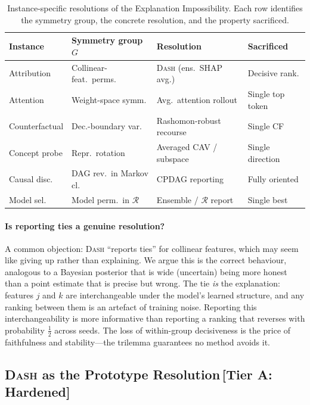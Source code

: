 \documentclass[11pt,a4paper]{article}
\newcommand{\DASH}{\textsc{Dash}}
\begin{document}
\begin{table}[t]
\centering
\caption{Instance-specific resolutions of the Explanation
  Impossibility.  Each row identifies the symmetry group, the concrete
  resolution, and the property sacrificed.}
\label{tab:resolutions}
\small
\setlength{\tabcolsep}{4pt}
\begin{tabular}{@{}llll@{}}
\toprule
Instance & Symmetry group $G$ & Resolution & Sacrificed \\
\midrule
Attribution & Collinear-feat.\ perms. & \DASH{} (ens.\ SHAP avg.) & Decisive rank. \\
Attention & Weight-space symm. & Avg.\ attention rollout & Single top token \\
Counterfactual & Dec.-boundary var. & Rashomon-robust recourse & Single CF \\
Concept probe & Repr.\ rotation & Averaged CAV / subspace & Single direction \\
Causal disc. & DAG rev.\ in Markov cl. & CPDAG reporting & Fully oriented \\
Model sel. & Model perm.\ in $\mathcal{R}$ & Ensemble / $\mathcal{R}$ report & Single best \\
\bottomrule
\end{tabular}
\end{table}

\paragraph{Is reporting ties a genuine resolution?}
A common objection: \DASH{} ``reports ties'' for collinear features, which may seem like giving up rather than explaining. We argue this is the correct behaviour, analogous to a Bayesian posterior that is wide (uncertain) being more honest than a point estimate that is precise but wrong. The tie \emph{is} the explanation: features $j$ and $k$ are interchangeable under the model's learned structure, and any ranking between them is an artefact of training noise. Reporting this interchangeability is more informative than reporting a ranking that reverses with probability $\tfrac{1}{2}$ across seeds. The loss of within-group decisiveness is the price of faithfulness and stability---the trilemma guarantees no method avoids it.

\subsection{\DASH{} as the Prototype Resolution\,\textnormal{\normalsize[Tier A: Hardened]}}
\label{sec:dash-prototype}
\end{document}
